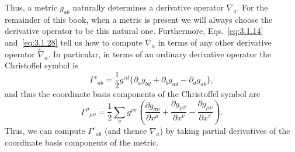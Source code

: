 Thus, a metric $g_{ab}$ naturally determines a derivative operator $\nabla_a$. For the remainder
of this book, when a metric is present we will always choose the derivative operator
to be this natural one. Furthermore, Eqs.~\eqref{eq:3.1.14} and~\eqref{eq:3.1.28} tell us how to
compute $\nabla_a$ in terms of any other derivative operator $\widetilde\nabla_a$. In particular, in terms of an
ordinary derivative operator the Christoffel symbol is
\begin{equation}
  \Gamma^c{}_{ab}=\frac{1}{2}g^{cd}
  \bigl\{\partial_ag_{bd}+\partial_bg_{ad}-\partial_dg_{ab}\bigr\},
  \tag{3.1.29}\label{eq:3.1.29}
\end{equation}
and thus the coordinate basis components of the Christoffel symbol are
\begin{equation}
  \Gamma^\rho{}_{\mu\nu}=\frac{1}{2}\sum_\sigma g^{\rho\sigma}
  \left(\frac{\partial g_{\sigma\nu}}{\partial x^\mu}
  +\frac{\partial g_{\mu\sigma}}{\partial x^\nu}
  -\frac{\partial g_{\mu\nu}}{\partial x^\sigma}\right).
  \tag{3.1.30}\label{eq:3.1.30}
\end{equation}
Thus, we can compute $\Gamma^c{}_{ab}$ (and thence $\nabla_a$) by taking partial derivatives of the
coordinate basis components of the metric.
